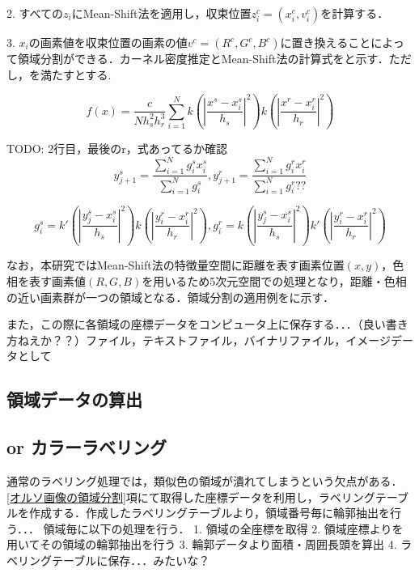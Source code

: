       2. すべての$z_{i}$にMean-Shift法を適用し，収束位置$z_{i}^c = (x_{i}^c , v_{i}^c)$を計算する．
      
      3. $x_{i}$の画素値を収束位置の画素の値$v^c = (R^c, G^c, B^c)$に置き換えることによって領域分割ができる．カーネル密度推定とMean-Shift法の計算式をと示す．ただし，を満たすとする.
    
      \begin{equation}
        \label{Mean-Shift法1}
        f(x) = \dfrac{c} {N h_{s}^2 h_{r}^3}
          \sum_{i=1}^{N}
          k (|\dfrac{x^s - x_{i}^s} {h_{s}}|^2) k (|\dfrac{x^r - x_{i}^r} {h_{r}}|^2)
      \end{equation}

      TODO: 2行目，最後のr，式あってるか確認
      \begin{equation}
        \label{Mean-Shift法2}
        y_{j+1}^s = 
          \dfrac{\sum_{i=1}^{N} g_{i}^s x_{i}^s} {\sum_{i=1}^{N} g_{i}^s}, 
        y_{j+1}^r = 
          \dfrac{\sum_{i=1}^{N} g_{i}^r x_{i}^r} {\sum_{i=1}^{N} g_{i}^r??}
      \end{equation}

      \begin{equation}
        \label{Mean-Shift法3}
        g_{i}^s = k' (|\dfrac{y_{j}^s - x_{i}^s} {h_{s}}|^2)
                  k  (|\dfrac{y_{i}^r - x_{i}^r} {h_{r}}|^2), 
        g_{i}^r = k  (|\dfrac{y_{j}^s - x_{i}^s} {h_{s}}|^2) 
                  k' (|\dfrac{y_{i}^r - x_{i}^r} {h_{r}}|^2)
      \end{equation}

      なお，本研究ではMean-Shift法の特徴量空間に距離を表す画素位置$(x,y)$，色相を表す画素値$(R,G,B)$を用いるため5次元空間での処理となり，距離・色相の近い画素群が一つの領域となる．領域分割の適用例を\fref{}に示す．

      また，この際に各領域の座標データをコンピュータ上に保存する．．．（良い書き方ねえか？？）ファイル，テキストファイル，バイナリファイル，イメージデータとして

    \subsection{領域データの算出}
    \subsection{or カラーラベリング}
      通常のラベリング処理では，類似色の領域が潰れてしまうという欠点がある．
      \ref{オルソ画像の領域分割}項にて取得した座標データを利用し，ラベリングテーブルを作成する．作成したラベリングテーブルより，領域番号毎に輪郭抽出を行う．．．
      領域毎に以下の処理を行う．
        1. 領域の全座標を取得
        2. 領域座標よりを用いてその領域の輪郭抽出を行う
        3. 輪郭データより面積・周囲長頭を算出
        4. ラベリングテーブルに保存．．．みたいな？
      


